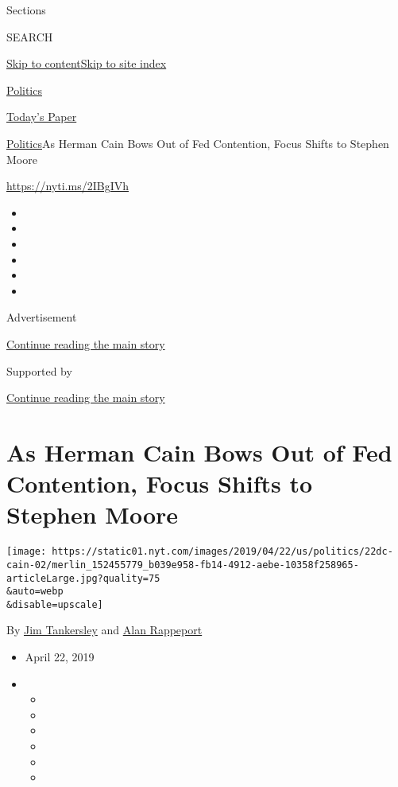 Sections

SEARCH

\protect\hyperlink{site-content}{Skip to
content}\protect\hyperlink{site-index}{Skip to site index}

\href{https://www.nytimes.com/section/politics}{Politics}

\href{https://myaccount.nytimes.com/auth/login?response_type=cookie\&client_id=vi}{}

\href{https://www.nytimes.com/section/todayspaper}{Today's Paper}

\href{/section/politics}{Politics}\textbar{}As Herman Cain Bows Out of
Fed Contention, Focus Shifts to Stephen Moore

\url{https://nyti.ms/2IBgIVh}

\begin{itemize}
\item
\item
\item
\item
\item
\item
\end{itemize}

Advertisement

\protect\hyperlink{after-top}{Continue reading the main story}

Supported by

\protect\hyperlink{after-sponsor}{Continue reading the main story}

\hypertarget{as-herman-cain-bows-out-of-fed-contention-focus-shifts-to-stephen-moore}{%
\section{As Herman Cain Bows Out of Fed Contention, Focus Shifts to
Stephen
Moore}\label{as-herman-cain-bows-out-of-fed-contention-focus-shifts-to-stephen-moore}}

\texttt{[image: https://static01.nyt.com/images/2019/04/22/us/politics/22dc-cain-02/merlin\_152455779\_b039e958-fb14-4912-aebe-10358f258965-articleLarge.jpg?quality=75\\\&auto=webp\\\&disable=upscale]}

By \href{https://www.nytimes.com/by/jim-tankersley}{Jim Tankersley} and
\href{https://www.nytimes.com/by/alan-rappeport}{Alan Rappeport}

\begin{itemize}
\item
  April 22, 2019
\item
  \begin{itemize}
  \item
  \item
  \item
  \item
  \item
  \item
  \end{itemize}
\end{itemize}

